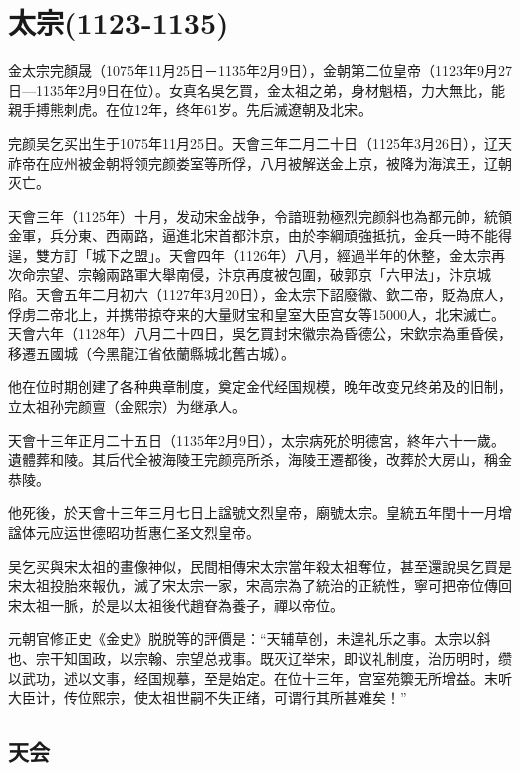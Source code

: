 
\section{太宗\tiny(1123-1135)}

金太宗完顏晟（1075年11月25日－1135年2月9日），金朝第二位皇帝（1123年9月27日—1135年2月9日在位）。女真名吳乞買，金太祖之弟，身材魁梧，力大無比，能親手搏熊刺虎。在位12年，终年61岁。先后滅遼朝及北宋。

完颜吴乞买出生于1075年11月25日。天會三年二月二十日（1125年3月26日），辽天祚帝在应州被金朝将领完颜娄室等所俘，八月被解送金上京，被降为海滨王，辽朝灭亡。

天會三年（1125年）十月，发动宋金战争，令諳班勃極烈完颜斜也為都元帥，統領金軍，兵分東、西兩路，逼進北宋首都汴京，由於李綱頑強抵抗，金兵一時不能得逞，雙方訂「城下之盟」。天會四年（1126年）八月，經過半年的休整，金太宗再次命宗望、宗翰兩路軍大舉南侵，汴京再度被包圍，破郭京「六甲法」，汴京城陷。天會五年二月初六（1127年3月20日），金太宗下詔廢徽、欽二帝，貶為庶人，俘虏二帝北上，并携带掠夺来的大量财宝和皇室大臣宫女等15000人，北宋滅亡。天會六年（1128年）八月二十四日，吳乞買封宋徽宗為昏德公，宋欽宗為重昏侯，移遷五國城（今黑龍江省依蘭縣城北舊古城）。

他在位时期创建了各种典章制度，奠定金代经国规模，晚年改变兄终弟及的旧制，立太祖孙完颜亶（金熙宗）为继承人。

天會十三年正月二十五日（1135年2月9日），太宗病死於明德宮，終年六十一歲。遺體葬和陵。其后代全被海陵王完颜亮所杀，海陵王遷都後，改葬於大房山，稱金恭陵。

他死後，於天會十三年三月七日上諡號文烈皇帝，廟號太宗。皇統五年閏十一月增諡体元应运世德昭功哲惠仁圣文烈皇帝。

吴乞买與宋太祖的畫像神似，民間相傳宋太宗當年殺太祖奪位，甚至還說吳乞買是宋太祖投胎來報仇，滅了宋太宗一家，宋高宗為了統治的正統性，寧可把帝位傳回宋太祖一脈，於是以太祖後代趙眘為養子，禪以帝位。

元朝官修正史《金史》脱脱等的評價是：“天辅草创，未遑礼乐之事。太宗以斜也、宗干知国政，以宗翰、宗望总戎事。既灭辽举宋，即议礼制度，治历明时，缵以武功，述以文事，经国规摹，至是始定。在位十三年，宫室苑籞无所增益。末听大臣计，传位熙宗，使太祖世嗣不失正绪，可谓行其所甚难矣！”

\subsection{天会}


